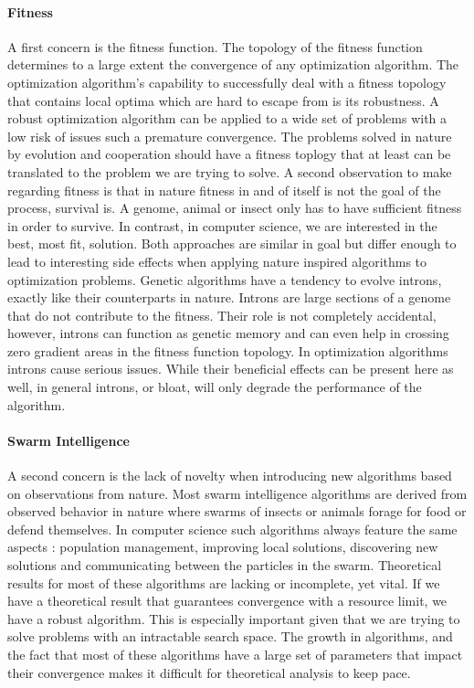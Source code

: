 \paragraph{Fitness}
A first concern is the fitness function. The topology of the fitness function determines to a large extent the convergence of any optimization algorithm. The optimization algorithm's capability to successfully deal with a fitness topology that contains local optima which are hard to escape from is its robustness. A robust optimization algorithm can be applied to a wide set of problems with a low risk of issues such a premature convergence. The problems solved in nature by evolution and cooperation should have a fitness toplogy that at least can be translated to the problem we are trying to solve. A second observation to make regarding fitness is that in nature fitness in and of itself is not the goal of the process, survival is. A genome, animal or insect only has to have sufficient fitness in order to survive. In contrast, in computer science, we are interested in the best, most fit, solution. Both approaches are similar in goal but differ enough to lead to interesting side effects when applying nature inspired algorithms to optimization problems. Genetic algorithms have a tendency to evolve introns, exactly like their counterparts in nature. Introns are large sections of a genome that do not contribute to the fitness. Their role is not completely accidental, however, introns can function as genetic memory and can even help in crossing zero gradient areas in the fitness function topology. %
In optimization algorithms introns cause serious issues. While their beneficial effects can be present here as well, in general introns, or bloat, will only degrade the performance of the algorithm. 
\paragraph{Swarm Intelligence}
A second concern is the lack of novelty when introducing new algorithms based on observations from nature. Most swarm intelligence algorithms are derived from observed behavior in nature where swarms of insects or animals forage for food or defend themselves. 
In computer science such algorithms always feature the same aspects : population management, improving local solutions, discovering new 
solutions and communicating between the particles in the swarm.
Theoretical results for most of these algorithms are lacking or incomplete, yet vital. If we have a theoretical result that guarantees convergence with a resource limit, we have a robust algorithm. This is especially important given that we are trying to solve problems with an intractable search space. The growth in algorithms, and the fact that most of these algorithms have a large set of parameters that impact their convergence makes it difficult for theoretical analysis to keep pace.

